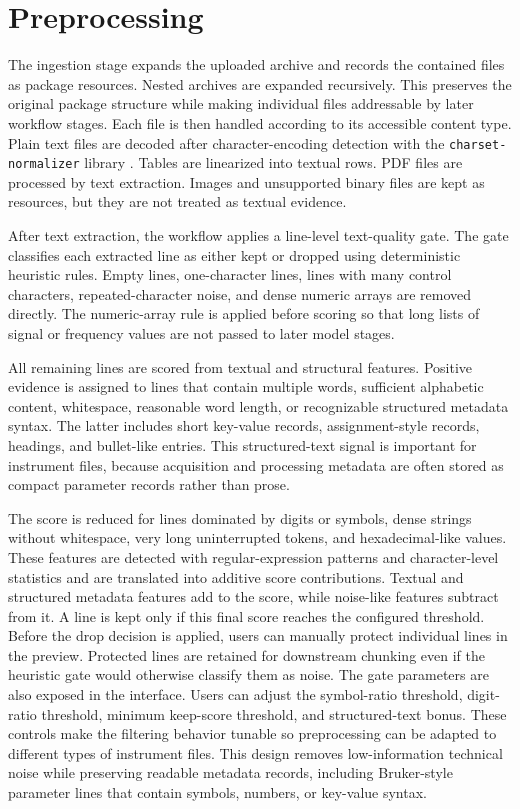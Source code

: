 \section{Preprocessing}
\label{sec:preprocessing}

The ingestion stage expands the uploaded archive and records the contained files as package resources.
Nested archives are expanded recursively.
This preserves the original package structure while making individual files addressable by later workflow stages.
Each file is then handled according to its accessible content type.
Plain text files are decoded after character-encoding detection with the \texttt{charset-normalizer} library \cite{charsetNormalizerDocs}.
Tables are linearized into textual rows.
PDF files are processed by text extraction.
Images and unsupported binary files are kept as resources, but they are not treated as textual evidence.

After text extraction, the workflow applies a line-level text-quality gate.
The gate classifies each extracted line as either kept or dropped using deterministic heuristic rules.
Empty lines, one-character lines, lines with many control characters, repeated-character noise, and dense numeric arrays are removed directly.
The numeric-array rule is applied before scoring so that long lists of signal or frequency values are not passed to later model stages.

All remaining lines are scored from textual and structural features.
Positive evidence is assigned to lines that contain multiple words, sufficient alphabetic content, whitespace, reasonable word length, or recognizable structured metadata syntax.
The latter includes short key-value records, assignment-style records, headings, and bullet-like entries.
This structured-text signal is important for instrument files, because acquisition and processing metadata are often stored as compact parameter records rather than prose.

The score is reduced for lines dominated by digits or symbols, dense strings without whitespace, very long uninterrupted tokens, and hexadecimal-like values.
These features are detected with regular-expression patterns and character-level statistics and are translated into additive score contributions.
Textual and structured metadata features add to the score, while noise-like features subtract from it.
A line is kept only if this final score reaches the configured threshold.
Before the drop decision is applied, users can manually protect individual lines in the preview.
Protected lines are retained for downstream chunking even if the heuristic gate would otherwise classify them as noise.
The gate parameters are also exposed in the interface.
Users can adjust the symbol-ratio threshold, digit-ratio threshold, minimum keep-score threshold, and structured-text bonus.
These controls make the filtering behavior tunable so preprocessing can be adapted to different types of instrument files.
This design removes low-information technical noise while preserving readable metadata records, including Bruker-style parameter lines that contain symbols, numbers, or key-value syntax.

